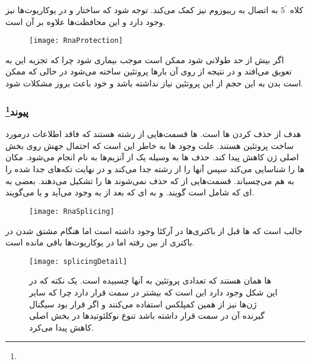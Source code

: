 \vspace{2cm}
کلاه
$ 5^\prime $
به اتصال
به ریبوزوم نیز کمک می‌کند.
توجه شود که ساختار
و
در یوکاریوت‌ها نیز وجود دارد و این محافظت‌ها علاوه بر آن است.

\begin{figure}[htbp]
\centering
\texttt{[image: RnaProtection]}
\end{figure}

اگر
بیش از حد طولانی شود ممکن است موجب بیماری شود چرا که تجزیه این
به تعویق می‌افتد و در نتیجه از روی آن بارها پروتئین ساخته می‌شود در حالی که ممکن است بدن به این حجم از این پروتئین نیاز نداشته باشد و خود باعث بروز مشکلات شود.

\pagebreak
\subsubsection{پیوند\protect\footnote{}}
هدف از
حذف کردن
ها است.
ها قسمت‌هایی از رشته
هستند که فاقد اطلاعات درمورد ساخت پرو‌تئین هستند. علت وجود
ها به خاطر این است که احتمال جهش روی بخش اصلی ژن کاهش پیدا کند. حذف
ها به وسیله یک
از آنزیم‌ها به نام
انجام می‌شود.
مکان
ها را شناسایی می‌کند سپس آنها را از رشته
جدا می‌کند و در نهایت تکه‌های جدا شده
را به هم می‌چسباند.
قسمت‌هایی از
که حذف نمی‌شوند
ها را تشکیل می‌دهند.
بعضی به
ای که شامل
است
گویند. و به
ای که بعد از
به وجود می‌آید
و یا
می‌گویند.

\begin{figure}[htbp]
\centering
\texttt{[image: RnaSplicing]}
\end{figure}

جالب است که
ها قبل از باکتری‌ها در آرکئا وجود داشته است اما هنگام مشتق شدن در باکتری از بین رفته اما در یوکاریوت‌ها باقی مانده است.

\begin{figure}[htbp]
\centering
\texttt{[image: splicingDetail]}
\caption{
ها همان
هستند که تعدادی پروتئین به آنها چسبیده است.
یک نکته که در این شکل وجود دارد این است که
بیشتر در سمت
قرار دارد چرا که سایر ژن‌ها نیز از همین کمپلکس استفاده می‌کنند و اگر قرار بود سیگنال گیرنده آن در سمت
قرار داشته باشد تنوع نوکلئوتید‌ها در بخش اصلی
کاهش پیدا می‌کرد.}
\end{figure}

